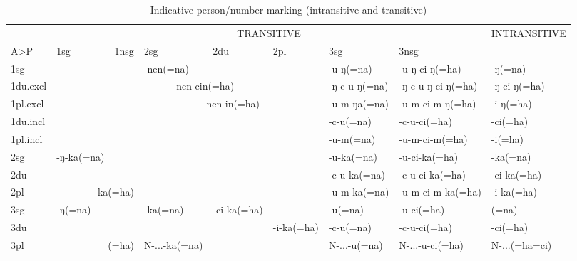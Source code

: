  
\begin{landscape}

\begin{table}
{\small
\begin{tabular}{|l||l|l|l|l|l|l|l|l|}
 \hline
 & \multicolumn{7}{c|}{ {\sc TRANSITIVE}}& {\sc INTRANSITIVE}\\
 \cline{2-8}
A>P		&	 {\sc 1sg}  &	  {\sc 1nsg}  &  {\sc 2sg}	 &  {\sc2du} &  {\sc 2pl} &  {\sc 3sg} &  {\sc 3nsg} &\\
 \hline
 \hline
 {\sc 1sg} 	 	&\multicolumn{2}{c|}{\cellcolor[gray]{.8}} & -nen(=na)&&& -u-ŋ(=na) &-u-ŋ-ci-ŋ(=ha)&  -ŋ(=na)	\\
 \cline{1-1} \cline{4-4} \cline{7-9}				
 {\sc 1du.excl} & \multicolumn{2}{c|}{\cellcolor[gray]{.8}}& \multicolumn{2}{c|}{-nen-cin(=ha)}& &-ŋ-c-u-ŋ(=na)&-ŋ-c-u-ŋ-ci-ŋ(=ha)&-ŋ-ci-ŋ(=ha)\\
 \cline{1-1} \cline{4-5} \cline{7-9}			
 {\sc 1pl.excl}&\multicolumn{2}{c|}{\cellcolor[gray]{.8}}& \multicolumn{3}{c|}{-nen-in(=ha)} &-u-m-ŋa(=na) &-u-m-ci-m-ŋ(=ha)	&-i-ŋ(=ha)  \\
 \cline{1-1} \cline{4-9}			
 {\sc 1du.incl } &\multicolumn{2}{c|}{\cellcolor[gray]{.8}}&\multicolumn{3}{c|}{\cellcolor[gray]{.8}}& -c-u(=na)  &   -c-u-ci(=ha)	&-ci(=ha)\\
 \cline{1-1} \cline{7-9}			
 {\sc 1pl.incl} &	\multicolumn{2}{c|}{\cellcolor[gray]{.8}}&\multicolumn{3}{c|}{\cellcolor[gray]{.8}}& -u-m(=na)  & -u-m-ci-m(=ha) & -i(=ha) \\
 \cline{1-3}\cline{7-9}				
 {\sc 2sg} &	-ŋ-ka(=na)  &	    & \multicolumn{3}{c|}{\cellcolor[gray]{.8}}& -u-ka(=na)  &   -u-ci-ka(=ha) &-ka(=na)\\
 \cline{1-2} \cline{7-9}			
 {\sc 2du} &	\multicolumn{2}{r|}{}  & \multicolumn{3}{c|}{\cellcolor[gray]{.8}} & -c-u-ka(=na)  &  -c-u-ci-ka(=ha) 	&-ci-ka(=ha)\\
 \cline{1-1} \cline{7-9}			
 {\sc 2pl} &\multicolumn{2}{r|}{-ka(=ha)}& \multicolumn{3}{c|}{\cellcolor[gray]{.8}}& -u-m-ka(=na)& -u-m-ci-m-ka(=ha) 	&-i-ka(=ha) \\
 \hline			
 {\sc 3sg} 	 &-ŋ(=na)	  &	      &  \multirow{2}{*}{-ka(=na)}& \multirow{3}{*}{-ci-ka(=ha)}  &    &-u(=na)&-u-ci(=ha)		&(=na)\\
  \cline{1-2}  \cline{7-9}					
 {\sc 3du}	 & \multicolumn{2}{r|}{}&   	&  &   -i-ka(=ha)&  -c-u(=na) &  -c-u-ci(=ha)	&-ci(=ha)\\
 \cline{1-1} \cline{4-4} \cline{7-9}	
 {\sc 3pl}	 	&\multicolumn{2}{r|}{(=ha)}&N-...-ka(=na)& & &N-...-u(=na)&N-...-u-ci(=ha)&N-...(=ha=ci)\\	
\hline
\end{tabular}
}
\caption{Indicative person/number marking (intransitive and transitive)}\label{agr-tab}
\end{table}
\end{landscape}









